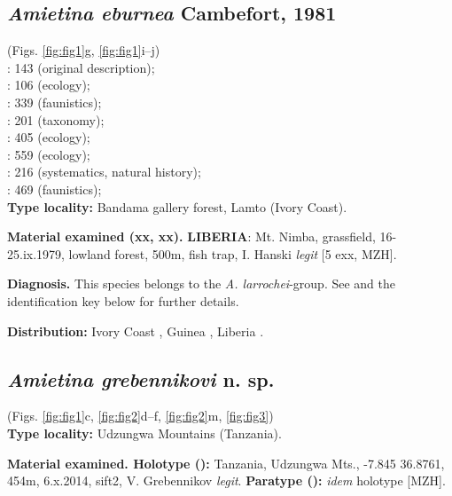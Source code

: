 \documentclass[fleqn,10pt,lineno]{wlpeerj}
\begin{document}
\subsection*{\textbf{\textit{Amietina eburnea} Cambefort, 1981}}
(Figs. \ref{fig:fig1}g, \ref{fig:fig1}i--j) \\
\cite{cambefort1981amietina}: 143 (original description);\\
\cite{cambefort1984etude}: 106 (ecology);\\
\cite{cambefort1985coleopteres}: 339 (faunistics);\\
\cite{branco1988deux}: 201 (taxonomy);\\
\cite{cambefort1991dung}: 405 (ecology);\\
\cite{cambefort2003nimba}: 559 (ecology);\\
\cite{davis2008african}: 216 (systematics, natural history);\\
\cite{moretto2010bayanga}: 469 (faunistics);\\

\textbf{Type locality:} Bandama gallery forest, Lamto (Ivory Coast).

\textbf{Material examined (xx\male\male, xx\female\female).} \textbf{LIBERIA}: Mt. Nimba, grassfield, 16-25.ix.1979, lowland forest, 500m, fish trap, I. Hanski \textit{legit} [5 exx, MZH].

\textbf{Diagnosis.} This species belongs to the \textit{A. larrochei}-group. See \citep{branco1988deux} and the identification key below for further details.

\textbf{Distribution:} Ivory Coast \citep{cambefort1981amietina}, Guinea \citep{cambefort2003nimba}, Liberia \citep{branco1988deux}.

\subsection*{\textbf{\textit{Amietina grebennikovi} n. sp.}}
(Figs. \ref{fig:fig1}c, \ref{fig:fig2}d--f, \ref{fig:fig2}m, \ref{fig:fig3})\\

\textbf{Type locality:} Udzungwa Mountains (Tanzania).

\textbf{Material examined. Holotype (\male):} Tanzania, Udzungwa Mts., -7.845 36.8761, 454m, 6.x.2014, sift2, V. Grebennikov \textit{legit}. \textbf{Paratype (\male):} \textit{idem} holotype [MZH].
\end{document}
